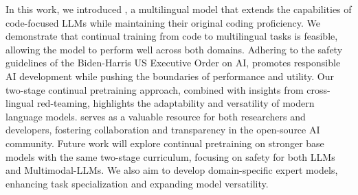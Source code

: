 


In this work, we introduced \textsc{\system}, a multilingual model that extends the capabilities of code-focused LLMs while maintaining their original coding proficiency. We demonstrate that continual training from code to multilingual tasks is feasible, allowing the model to perform well across both domains. Adhering to the safety guidelines of the Biden-Harris US Executive Order on AI, \textsc{\system} promotes responsible AI development while pushing the boundaries of performance and utility. Our two-stage continual pretraining approach, combined with insights from cross-lingual red-teaming, highlights the adaptability and versatility of modern language models. \textsc{\system} serves as a valuable resource for both researchers and developers, fostering collaboration and transparency in the open-source AI community. Future work will explore continual pretraining on stronger base models with the same two-stage curriculum, focusing on safety for both LLMs and Multimodal-LLMs. We also aim to develop domain-specific expert models, enhancing task specialization and expanding model versatility.








